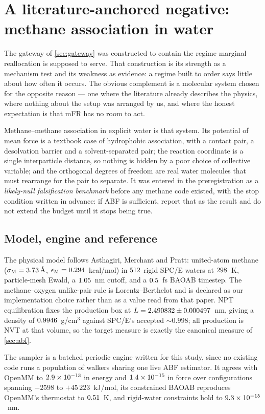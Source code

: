 \section{A literature-anchored negative: methane association in water}
\label{sec:methane}

The gateway of \cref{sec:gateway} was constructed to contain the regime marginal reallocation
is supposed to serve. That construction is its strength as a mechanism test and its weakness as
evidence: a regime built to order says little about how often it occurs. The obvious complement
is a molecular system chosen for the opposite reason --- one where the literature already
describes the physics, where nothing about the setup was arranged by us, and where the honest
expectation is that mFR has no room to act.

Methane--methane association in explicit water is that system. Its potential of mean force is a
textbook case of hydrophobic association, with a contact pair, a desolvation barrier and a
solvent-separated pair; the reaction coordinate is a single interparticle distance, so nothing
is hidden by a poor choice of collective variable; and the orthogonal degrees of freedom are
real water molecules that must rearrange for the pair to separate. It was entered in the
preregistration as a \emph{likely-null falsification benchmark} before any methane code existed,
with the stop condition written in advance: if ABF is sufficient, report that as the result and
do not extend the budget until it stops being true.

\subsection{Model, engine and reference}

The physical model follows Asthagiri, Merchant and Pratt: united-atom methane
($\sigma_{\mathrm M} = 3.73\,\text{\AA}$, $\epsilon_{\mathrm M} = 0.294$~kcal/mol) in
$512$ rigid SPC/E waters at $298$~K, particle-mesh Ewald, a
$1.05$~nm cutoff, and a $0.5$~fs BAOAB timestep. The methane--oxygen unlike-pair rule is
Lorentz--Berthelot and is declared as our implementation choice rather than as a value read from
that paper. NPT equilibration fixes the production box at $L = 2.490832 \pm 0.000497$~nm, giving
a density of $0.9946$~g/cm$^3$ against SPC/E's accepted $\sim 0.998$; all production is NVT
at that volume, so the target measure is exactly the canonical measure of \cref{sec:abf}.

The sampler is a batched periodic engine written for this study, since no existing code runs a
population of walkers sharing one live ABF estimator. It agrees with OpenMM to
$2.9\times10^{-13}$ in energy and $1.4\times10^{-15}$ in force over configurations spanning
$-2598$ to $+45\,223$~kJ/mol, its constrained BAOAB reproduces OpenMM's thermostat to
$0.51$~K, and rigid-water constraints hold to $9.3\times10^{-15}$~nm.

